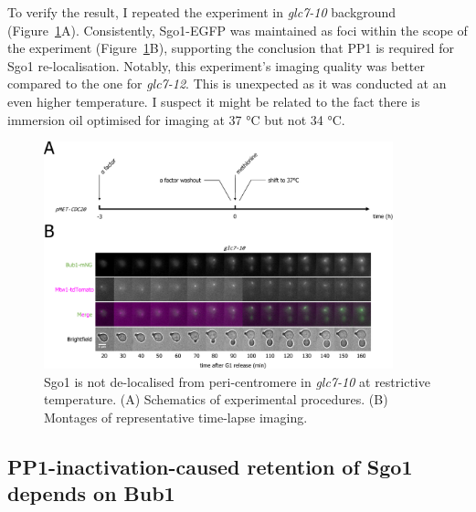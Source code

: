 To verify the result, I repeated the experiment in \textit{glc7-10} background (Figure~\ref{fig:sgo1glc710}A). Consistently, Sgo1-EGFP was maintained as foci within the scope of the experiment (Figure~\ref{fig:sgo1glc710}B), supporting the conclusion that PP1 is required for Sgo1 re-localisation. Notably, this experiment's imaging quality was better compared to the one for \textit{glc7-12}. This is unexpected as it was conducted at an even higher temperature. I suspect it might be related to the fact there is immersion oil optimised for imaging at 37 \si{\celsius} but not 34 \si{\celsius}. 

\begin{figure}[htbp]
  \centering
  \includegraphics[width=0.9\textwidth]{chapter3/figures/Sgo1 glc7-10.pdf}
  \caption[Sgo1 is not de-localised from peri-centromere in \textit{glc7-10} at restrictive temperature]{Sgo1 is not de-localised from peri-centromere in \textit{glc7-10} at restrictive temperature. (A) Schematics of experimental procedures. (B) Montages of representative time-lapse imaging.}
  \label{fig:sgo1glc710}
\end{figure}

\subsection{PP1-inactivation-caused retention of Sgo1 depends on Bub1}

